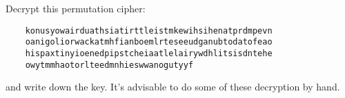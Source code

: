   Decrypt this permutation cipher:
  \begin{Verbatim}
    konusyowairduathsiatirttleistmkewihsihenatprdmpevn
    oanigoliorwackatmhfianboemlrteseeudganubtodatofeao
    hispaxtinyioenedpipstcheiaatlelairywdhlitsisdntehe
    owytmmhaotorlteedmnhieswwanogutyyf
  \end{Verbatim}
    and write down the key.
  It's advisable to do some of these decryption by hand.
